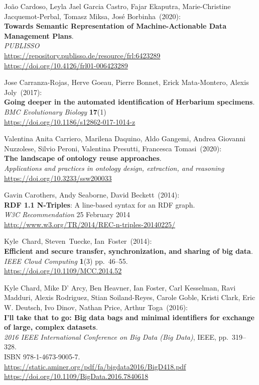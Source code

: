 \begin{thebibliography}{9}
João Cardoso, Leyla Jael Garcia Castro, Fajar Ekaputra, Marie-Christine Jacquemot-Perbal, Tomasz Miksa, José Borbinha~(2020): \\
\textbf{Towards Semantic Representation of Machine-Actionable Data
Management Plans}.\\
\emph{PUBLISSO}\\
\url{https://repository.publisso.de/resource/frl:6423289}\\
\url{https://doi.org/10.4126/frl01-006423289}

Jose Carranza-Rojas, Herve Goeau, Pierre Bonnet, Erick Mata-Montero, Alexis Joly~(2017): \\
\textbf{Going deeper in the automated identification of Herbarium specimens}.\\
\emph{BMC Evolutionary Biology} \textbf{17}(1)\\
\url{https://doi.org/10.1186/s12862-017-1014-z}

Valentina Anita Carriero, Marilena Daquino, Aldo Gangemi, Andrea
Giovanni Nuzzolese, Silvio Peroni, Valentina Presutti, Francesca
Tomasi~(2020): \\
\textbf{The landscape of ontology reuse approaches}. \\
\emph{Applications and practices in ontology design, extraction, and
reasoning} \\
\url{https://doi.org/10.3233/ssw200033}

Gavin Carothers, Andy Seaborne, David Beckett~(2014): \\
\textbf{RDF 1.1 N-Triples}: A line-based syntax for an RDF graph.\\
\emph{W3C Recommendation} 25 February 2014\\
\url{http://www.w3.org/TR/2014/REC-n-triples-20140225/}


Kyle~Chard, Steven~Tuecke, Ian~Foster~(2014): \\
\textbf{Efficient and secure transfer, synchronization, and sharing of
big data}.\\
\emph{IEEE Cloud Computing} \textbf{1}(3) pp.~46--55.\\
\url{https://doi.org/10.1109/MCC.2014.52}

Kyle Chard, Mike D' Arcy, Ben Heavner, Ian Foster, Carl
Kesselman, Ravi Madduri, Alexis Rodriguez, Stian Soiland-Reyes, Carole
Goble, Kristi Clark, Eric W. Deutsch, Ivo Dinov, Nathan Price, Arthur
Toga~(2016): \\
\textbf{I'll take that to go: Big data bags and minimal identifiers for
exchange of large, complex datasets}.\\
\emph{2016 IEEE International Conference on Big Data (Big Data)}, IEEE,
pp.~319--328.\\
ISBN 978-1-4673-9005-7.\\
\url{https://static.aminer.org/pdf/fa/bigdata2016/BigD418.pdf}\\
\url{https://doi.org/10.1109/BigData.2016.7840618}


\end{thebibliography}
